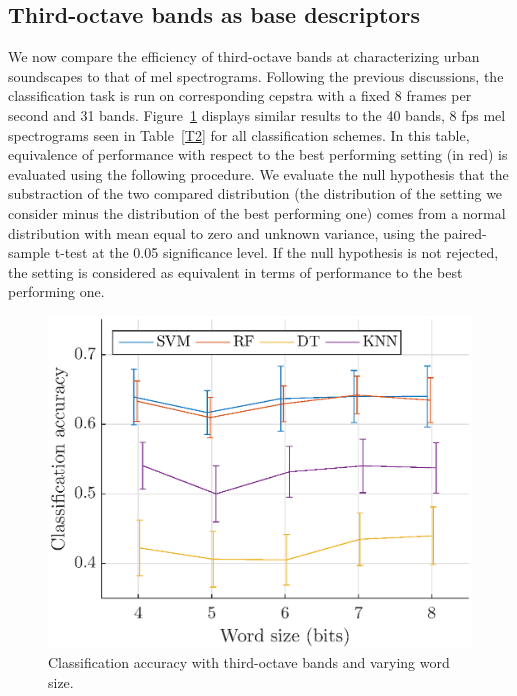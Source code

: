 \documentclass[final,3p,times,twocolumn]{elsarticle}
\begin{document}
\subsection{Third-octave bands as base descriptors}

We now compare the efficiency of third-octave bands at characterizing urban soundscapes to that of mel spectrograms. Following the previous discussions, the classification task is run on corresponding cepstra with a fixed 8 frames per second and 31 bands. Figure~\ref{fig:class_tob_q} displays similar results to the 40 bands, 8 fps mel spectrograms seen in Table~\ref{T2} for all classification schemes. In this table, equivalence of performance with respect to the best performing setting (in red) is evaluated using the following procedure. We evaluate the null hypothesis that the substraction of the two compared distribution (the distribution of the setting we consider minus the distribution of the best performing one) comes from a normal distribution with mean equal to zero and unknown variance, using the paired-sample t-test at the 0.05 significance level. If the null hypothesis is not rejected, the setting is considered as equivalent in terms of performance to the best performing one. \\

\begin{figure}[htbp]
	\centering
		\includegraphics[width=\columnwidth]{figures/class_tob_q.eps}
	\caption{Classification accuracy with third-octave bands and varying word size.}
	\label{fig:class_tob_q}
\end{figure}
\end{document}
